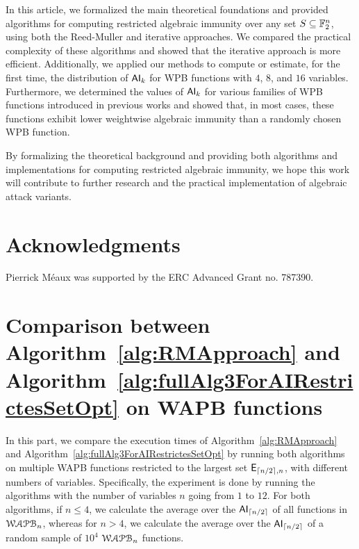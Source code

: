 \documentclass[11pt]{llncs}
\begin{document}


In this article, we formalized the main theoretical foundations and provided algorithms for computing restricted algebraic immunity over any set $S \subseteq \mathbb{F}_2^n$, using both the Reed-Muller and iterative approaches. 
We compared the practical complexity of these algorithms and showed that the iterative approach is more efficient. 
Additionally, we applied our methods to compute or estimate, for the first time, the distribution of $\mathsf{AI}_k$ for WPB functions with $4$, $8$, and $16$ variables. 
Furthermore, we determined the values of $\mathsf{AI}_k$ for various families of WPB functions introduced in previous works and showed that, in most cases, these functions exhibit lower weightwise algebraic immunity than a randomly chosen WPB function.  

By formalizing the theoretical background and providing both algorithms and implementations for computing restricted algebraic immunity, we hope this work will contribute to further research and the practical implementation of algebraic attack variants. 

\section{Acknowledgments}
Pierrick Méaux was supported by the ERC Advanced Grant no. 787390.




\ifnum{}


\else


\fi

\appendix

\section{Comparison between Algorithm~\ref{alg:RMApproach} and Algorithm~\ref{alg:fullAlg3ForAIRestrictesSetOpt} on WAPB functions}\label{appendix:algsComparison}

In this part, we compare the execution times of Algorithm~\ref{alg:RMApproach} and Algorithm~\ref{alg:fullAlg3ForAIRestrictesSetOpt} by running both algorithms on multiple WAPB functions restricted to the largest set $\mathsf{E}_{\lceil{n/2}\rceil,n}$, with different numbers of variables. 
Specifically, the experiment is done by running the algorithms with the number of variables $n$ going from $1$ to $12$. For both algorithms, if $n \leq 4$, we calculate the average over the $\mathsf{AI}_{\lceil{n/2}\rceil}$ of all functions in $\mathcal{WAPB}_{n}$, whereas for $n > 4$, we calculate the average over the $\mathsf{AI}_{\lceil{n/2}\rceil}$ of a random sample of $10^4$ $\mathcal{WAPB}_{n}$ functions.
\end{document}
